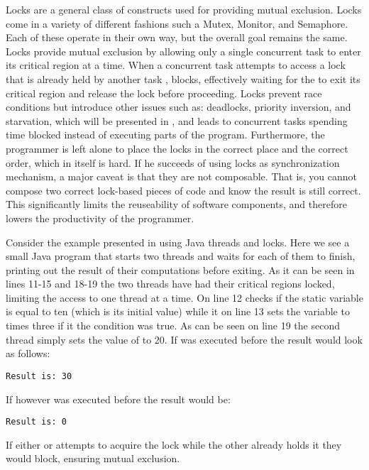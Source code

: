 Locks are a general class of constructs used for providing mutual exclusion. Locks come in a variety of different fashions such a Mutex, Monitor, and Semaphore. Each of these operate in their own way, but the overall goal remains the same. Locks provide mutual exclusion by allowing only a single concurrent task to enter its critical region at a time. When a concurrent task  attempts to access a lock that is already held by another task , blocks, effectively waiting for the  to exit its critical region and release the lock before proceeding. Locks prevent race conditions but introduce other issues such as: deadlocks, priority inversion, and starvation, which will be presented in , and leads to concurrent tasks spending time blocked instead of executing parts of the program. Furthermore, the programmer is left alone to place the locks in the correct place and the correct order, which in itself is hard. If he succeeds of using locks as synchronization mechanism, a major caveat is that they are not composable\cite[p. 58]{sutter2005software}. That is, you cannot compose two correct lock-based pieces of code and know the result is still correct. This significantly limits the reuseability of software components, and therefore lowers the productivity of the programmer.

Consider the example presented in  using Java threads and locks. Here we see a small Java program that starts two threads and waits for each of them to finish, printing out the result of their computations before exiting. As it can be seen in lines 11-15 and 18-19 the two threads have had their critical regions locked, limiting the access to one thread at a time. On line 12  checks if the static variable  is equal to ten (which is its initial value) while it on line 13 sets the  variable to  times three if it the condition was true. As can be seen on line 19 the second thread simply sets the value of  to 20. If  was executed before  the result would look as follows:
\begin{verbatim}
Result is: 30
\end{verbatim}
If however  was executed before  the result would be:
\begin{verbatim}
Result is: 0
\end{verbatim}
If either  or  attempts to acquire the lock while the other already holds it they would block, ensuring mutual exclusion.

